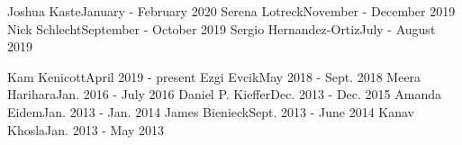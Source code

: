 
\begin{cvstudentlist}
	\cvstudent
	{Joshua Kaste}{January - February 2020}
	\cvstudent
	{Serena Lotreck}{November - December 2019}
	\cvstudent
	{Nick Schlecht}{September - October 2019}
	\cvstudent
	{Sergio Hernandez-Ortiz}{July - August 2019}

\end{cvstudentlist}

\begin{cvstudentlist}
	\cvstudent
	{Kam Kenicott}{April 2019 - present}
	\cvstudent
	{Ezgi Evcik}{May 2018 - Sept. 2018}
	\cvstudent
	{Meera Harihara}{Jan. 2016 - July 2016}
	\cvstudent
	{Daniel P. Kieffer}{Dec. 2013 - Dec. 2015}
	\cvstudent
	{Amanda Eidem}{Jan. 2013 - Jan. 2014}
	\cvstudent
	{James Bienieck}{Sept. 2013 - June 2014}
	\cvstudent
	{Kanav Khosla}{Jan. 2013 - May 2013}
\end{cvstudentlist}